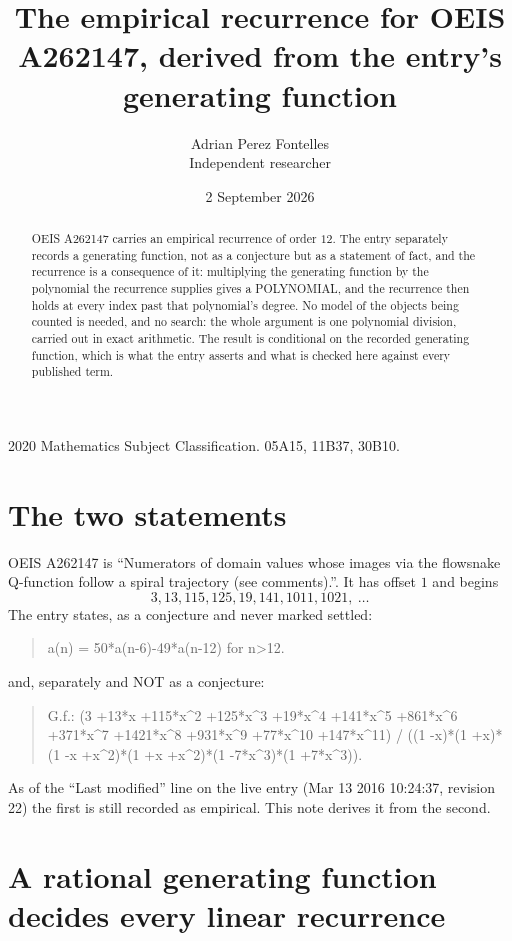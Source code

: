 \documentclass[11pt,a4paper]{article}
\title{The empirical recurrence for OEIS A262147, derived from the entry's generating function}
\author{Adrian Perez Fontelles\\ \small Independent researcher}
\date{2 September 2026}
\theoremstyle{plain}
\theoremstyle{definition}
\begin{document}
\maketitle

\begin{abstract}
OEIS A262147 carries an empirical recurrence of order $12$. The entry separately records a
generating function, not as a conjecture but as a statement of fact, and the recurrence is a
consequence of it: multiplying the generating function by the polynomial the recurrence
supplies gives a POLYNOMIAL, and the recurrence then holds at every index past that
polynomial's degree. No model of the objects being counted is needed, and no search: the
whole argument is one polynomial division, carried out in exact arithmetic. The result is
conditional on the recorded generating function, which is what the entry asserts and what is
checked here against every published term.
\end{abstract}

\noindent\small 2020 Mathematics Subject Classification. 05A15, 11B37, 30B10.\normalsize

\section{The two statements}

OEIS A262147 is ``Numerators of domain values whose images via the flowsnake Q-function follow a spiral trajectory (see comments).''. It has offset $1$ and begins
\[
3, 13, 115, 125, 19, 141, 1011, 1021,\ \dots
\]
The entry states, as a conjecture and never marked settled:
\begin{quote}
a(n) = 50*a(n-6)-49*a(n-12) for n>12.
\end{quote}
and, separately and NOT as a conjecture:
\begin{quote}
G.f.: (3 +13*x +115*x\^{}2 +125*x\^{}3 +19*x\^{}4 +141*x\^{}5 +861*x\^{}6 +371*x\^{}7 +1421*x\^{}8 +931*x\^{}9 +77*x\^{}10 +147*x\^{}11) / ((1 -x)*(1 +x)*(1 -x +x\^{}2)*(1 +x +x\^{}2)*(1 -7*x\^{}3)*(1 +7*x\^{}3)).
\end{quote}
As of the ``Last modified'' line on the live entry (Mar 13 2016 10:24:37, revision 22) the first is still
recorded as empirical. This note derives it from the second.

\section{A rational generating function decides every linear recurrence}
\end{document}
